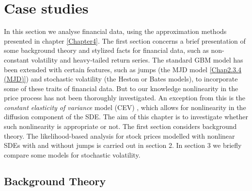 \section{Case studies}
\label{sec::case_studies}
In this section we analyse financial data, using the approximation methods presented in chapter \ref{Chapter4}.
The first section concerns a brief presentation of some background theory and stylized facts for financial data, such as non-constant volatility and heavy-tailed return series.
The standard GBM model has been extended with certain features, such as jumps (the MJD model \ref{Chap2.3.4 (MJD)}) and stochastic volatility (the Heston or Bates models), to incorporate some of these traits of financial data.
But to our knowledge nonlinearity in the price process has not been thoroughly investigated.
An exception from this is the \textit{constant elasticity of variance} model (CEV) \cite{cox1975notes}, which allows for nonlinearity in the diffusion component of the SDE.
The aim of this chapter is to investigate whether such nonlinearity is appropriate or not.
The first section considers background theory.
The likelihood-based analysis for stock prices modelled with nonlinear SDEs with and without jumps is carried out in section 2.
In section 3 we briefly compare some models for stochastic volatility. 








\subsection{Background Theory}


